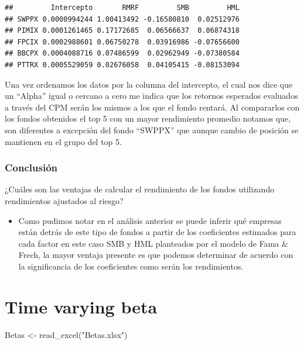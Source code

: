 \documentclass[
  12pt,
]{article}
\newenvironment{Shaded}{\begin{snugshade}}{\end{snugshade}}
\newcommand{\FunctionTok}[1]{\textcolor[rgb]{0.00,0.00,0.00}{#1}}
\newcommand{\NormalTok}[1]{#1}
\newcommand{\OtherTok}[1]{\textcolor[rgb]{0.56,0.35,0.01}{#1}}
\newcommand{\StringTok}[1]{\textcolor[rgb]{0.31,0.60,0.02}{#1}}
\providecommand{\tightlist}{%
  \setlength{\itemsep}{0pt}\setlength{\parskip}{0pt}}
\begin{document}
\begin{verbatim}
##         Intercepto       RMRF         SMB         HML
## SWPPX 0.0000994244 1.00413492 -0.16580810  0.02512976
## PIMIX 0.0001261465 0.17172685  0.06566637  0.06874318
## FPCIX 0.0002988601 0.06750278  0.03916986 -0.07656600
## BBCPX 0.0004088716 0.07486599  0.02962949 -0.07380584
## PTTRX 0.0005529059 0.02676058  0.04105415 -0.08153094
\end{verbatim}

Una vez ordenamos los datos por la columna del intercepto, el cual nos
dice que un ``Alpha'' igual o cercano a cero me indica que los retornos
esperados evaluados a través del CPM serán los mismos a los que el fondo
rentará. Al compararlos con los fondos obtenidos el top 5 con un mayor
rendimiento promedio notamos que, son diferentes a excepción del fondo
``SWPPX'' que aunque cambio de posición se mantienen en el grupo del top
5.

\hypertarget{conclusiuxf3n}{%
\subsubsection{Conclusión}\label{conclusiuxf3n}}

¿Cuáles son las ventajas de calcular el rendimiento de los fondos
utilizando rendimientos ajustados al riesgo?

\begin{itemize}
\tightlist
\item
  Como pudimos notar en el análisis anterior se puede inferir qué
  empresas están detrás de este tipo de fondos a partir de los
  coeficientes estimados para cada factor en este caso SMB y HML
  planteados por el modelo de Fama \& Frech, la mayor ventaja presente
  es que podemos determinar de acuerdo con la significancia de los
  coeficientes como serán los rendimientos.
\end{itemize}

\hypertarget{time-varying-beta}{%
\section{Time varying beta}\label{time-varying-beta}}

\begin{Shaded}
\begin{Highlighting}[]
\NormalTok{Betas }\OtherTok{\textless{}{-}} \FunctionTok{read\_excel}\NormalTok{(}\StringTok{"Betas.xlsx"}\NormalTok{)}
\end{Highlighting}
\end{Shaded}
\end{document}
